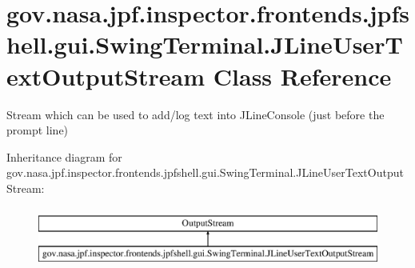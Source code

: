 \hypertarget{classgov_1_1nasa_1_1jpf_1_1inspector_1_1frontends_1_1jpfshell_1_1gui_1_1_swing_terminal_1_1_j_line_user_text_output_stream}{}\section{gov.\+nasa.\+jpf.\+inspector.\+frontends.\+jpfshell.\+gui.\+Swing\+Terminal.\+J\+Line\+User\+Text\+Output\+Stream Class Reference}
\label{classgov_1_1nasa_1_1jpf_1_1inspector_1_1frontends_1_1jpfshell_1_1gui_1_1_swing_terminal_1_1_j_line_user_text_output_stream}


Stream which can be used to add/log text into J\+Line\+Console (just before the prompt line)  


Inheritance diagram for gov.\+nasa.\+jpf.\+inspector.\+frontends.\+jpfshell.\+gui.\+Swing\+Terminal.\+J\+Line\+User\+Text\+Output\+Stream\+:\begin{figure}[H]
\begin{center}
\leavevmode
\includegraphics[height=2.000000cm]{classgov_1_1nasa_1_1jpf_1_1inspector_1_1frontends_1_1jpfshell_1_1gui_1_1_swing_terminal_1_1_j_line_user_text_output_stream}
\end{center}
\end{figure}
